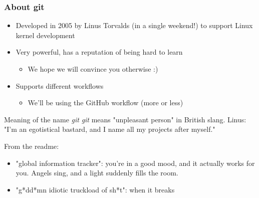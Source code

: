 \begin{frame}

\frametitle{About git}
	
\begin{itemize}
	\item Developed in 2005 by Linus Torvalds (in a single weekend!) to support Linux kernel development
	\item Very powerful, has a reputation of being hard to learn
	\begin{itemize}
	\item We hope we will convince you otherwise :)
	\end{itemize}
	\item Supports different workflows
	\begin{itemize}
	\item We'll be using the GitHub workflow (more or less)	
	\end{itemize}
\end{itemize}

\begin{block}{Meaning of the name \emph{git}}
\small
\emph{git} means "unpleasant person" in British slang. Linus: "I'm an egotistical bastard, and I name all my projects after myself."

\medskip
From the readme:
	 \begin{itemize}
	 \item "global information tracker": you're in a good mood, and it actually works for you. Angels sing, and a light suddenly fills the room.
	 \item "g*dd*mn idiotic truckload of sh*t": when it breaks
	 \end{itemize}
	 
\end{block}

\end{frame}


